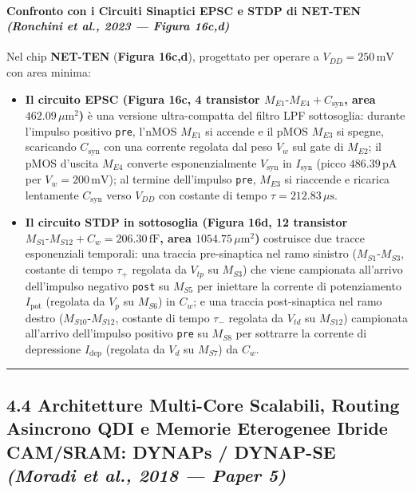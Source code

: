 \documentclass[11pt,a4paper]{article}
\begin{document}
\paragraph{Confronto con i Circuiti Sinaptici EPSC e STDP di NET-TEN \textit{(Ronchini et al., 2023 --- Figura 16c,d)}}
Nel chip \textbf{NET-TEN} (\textbf{Figura 16c,d}), progettato per operare a $V_{DD} = 250\,\text{mV}$ con area minima:
\begin{itemize}
  \item \textbf{Il circuito EPSC (Figura 16c, 4 transistor $M_{E1}\text{-}M_{E4} + C_{\text{syn}}$, area $462.09\,\mu\text{m}^2$)} è una versione ultra-compatta del filtro LPF sottosoglia: durante l'impulso positivo \texttt{pre}, l'nMOS $M_{E1}$ si accende e il pMOS $M_{E3}$ si spegne, scaricando $C_{\text{syn}}$ con una corrente regolata dal peso $V_w$ sul gate di $M_{E2}$; il pMOS d'uscita $M_{E4}$ converte esponenzialmente $V_{\text{syn}}$ in $I_{\text{syn}}$ (picco $486.39\,\text{pA}$ per $V_w = 200\,\text{mV}$); al termine dell'impulso \texttt{pre}, $M_{E3}$ si riaccende e ricarica lentamente $C_{\text{syn}}$ verso $V_{DD}$ con costante di tempo $\tau = 212.83\,\mu\text{s}$.
  \item \textbf{Il circuito STDP in sottosoglia (Figura 16d, 12 transistor $M_{S1}\text{-}M_{S12} + C_w = 206.30\,\text{fF}$, area $1054.75\,\mu\text{m}^2$)} costruisce due tracce esponenziali temporali: una traccia pre-sinaptica nel ramo sinistro ($M_{S1}\text{-}M_{S3}$, costante di tempo $\tau_+$ regolata da $V_{tp}$ su $M_{S3}$) che viene campionata all'arrivo dell'impulso negativo \texttt{post} su $M_{S5}$ per iniettare la corrente di potenziamento $I_{\text{pot}}$ (regolata da $V_p$ su $M_{S6}$) in $C_w$; e una traccia post-sinaptica nel ramo destro ($M_{S10}\text{-}M_{S12}$, costante di tempo $\tau_-$ regolata da $V_{td}$ su $M_{S12}$) campionata all'arrivo dell'impulso positivo \texttt{pre} su $M_{S8}$ per sottrarre la corrente di depressione $I_{\text{dep}}$ (regolata da $V_d$ su $M_{S7}$) da $C_w$.
\end{itemize}

\bigskip\hrule\bigskip

\subsection{4.4 Architetture Multi-Core Scalabili, Routing Asincrono QDI e Memorie Eterogenee Ibride CAM/SRAM: DYNAPs / DYNAP-SE \textit{(Moradi et al., 2018 --- Paper 5)}}
\end{document}
